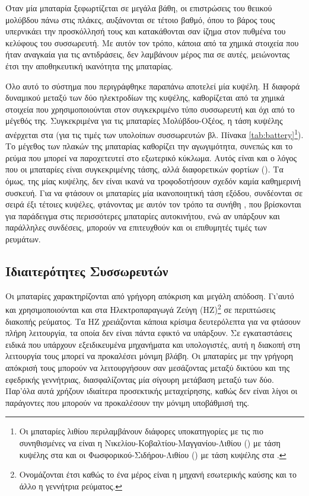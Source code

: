 \documentclass[12pt]{report}
\begin{document}
Όταν μία μπαταρία ξεφωρτίζεται σε μεγάλα βάθη, οι επιστρώσεις του θειικού μολύβδου πάνω στις πλάκες, αυξάνονται σε τέτοιο βαθμό, όπου το βάρος τους υπερνικάει την προσκόλλησή τους και κατακάθονται σαν ίζημα στον πυθμένα του κελύφους
του συσσωρευτή. Με αυτόν τον τρόπο, κάποια από τα χημικά στοιχεία που ήταν αναγκαία για τις αντιδράσεις, δεν λαμβάνουν μέρος πια σε αυτές, μειώνοντας έτσι την αποθηκευτική ικανότητα της μπαταρίας.

Όλο αυτό το σύστημα που περιγράφθηκε παραπάνω αποτελεί μία κυψέλη. Η διαφορά δυναμικού μεταξύ των δύο ηλεκτροδίων της κυψέλης, καθορίζεται από τα χημικά στοιχεία που χρησιμοποιούνται στον συγκεκριμένο τύπο συσσωρευτή και όχι
από το μέγεθός της. Συγκεκριμένα για τις μπαταρίες Μολύβδου-Οξέος, η τάση κυψέλης ανέρχεται στα {} (για τις τιμές των υπολοίπων συσσωρευτών βλ. Πίνακα \ref{tab:battery}\footnote{Οι μπαταρίες λιθίου περιλαμβάνουν 
διάφορες υποκατηγορίες με τις πιο συνηθισμένες να είναι η Νικελίου-Κοβαλτίου-Μαγγανίου-Λιθίου ({}) με τάση κυψέλης στα {} και οι Φωσφορικού-Σιδήρου-Λιθίου ({}) με τάση κυψέλης στα 
{}.}). Το μέγεθος των πλακών της μπαταρίας καθορίζει την αγωγιμότητα, συνεπώς και το ρεύμα που μπορεί να παροχετευτεί στο εξωτερικό κύκλωμα. Αυτός είναι και ο λόγος που οι μπαταρίες είναι συγκεκριμένης τάσης, αλλά 
διαφορετικών φορτίων ({}). Τα {} όμως, της μίας κυψέλης, δεν είναι ικανά να τροφοδοτήσουν σχεδόν καμία καθημερινή συσκευή. Για να φτάσουν οι μπαταρίες μία ικανοποιητική τάση εξόδου, συνδέονται σε σειρά 
έξι τέτοιες κυψέλες, φτάνοντας με αυτόν τον τρόπο τα συνήθη {}, που βρίσκονται για παράδειγμα στις περισσότερες μπαταρίες αυτοκινήτου, ενώ αν υπάρξουν και παράλληλες συνδέσεις, μπορούν να επιτευχθούν και οι επιθυμητές
τιμές των ρευμάτων.

\subsection{Ιδιαιτερότητες Συσσωρευτών}
Οι μπαταρίες χαρακτηρίζονται από γρήγορη απόκριση και μεγάλη απόδοση. Γι'αυτό και χρησιμοποιούνται και στα Ηλεκτροπαραγωγά Ζεύγη (ΗΖ)\footnote{Ονομάζονται έτσι καθώς το ένα μέρος είναι η μηχανή εσωτερικής καύσης και το άλλο η 
γεννήτρια ρεύματος.} σε περιπτώσεις διακοπής ρεύματος. Τα ΗΖ χρειάζονται κάποια κρίσιμα δευτερόλεπτα για να φτάσουν πλήρη λειτουργία, τα οποία δεν είναι πάντα εφικτό να υπάρξουν. Σε εγκαταστάσεις ειδικά που υπάρχουν εξειδικευμένα 
μηχανήματα και υπολογιστές, αυτή η διακοπή στη λειτουργία τους μπορεί να προκαλέσει μόνιμη βλάβη. Οι μπαταρίες με την γρήγορη απόκρισή τους μπορούν να λειτουργήσουν σαν μεσάζοντας μεταξύ δικτύου και της εφεδρικής γεννήτριας, 
διασφαλίζοντας μία σίγουρη μετάβαση μεταξύ των δύο. Παρ'όλα αυτά χρήζουν ιδιαίτερα προσεκτικής μεταχείρησης, καθώς δεν είναι λίγοι οι παράγοντες που μπορούν να προκαλέσουν την μόνιμη υποβάθμισή της.
\end{document}

